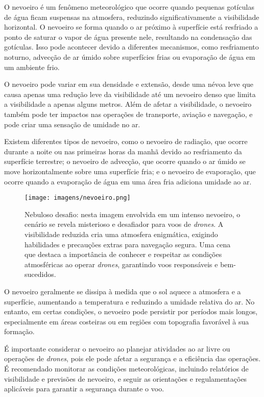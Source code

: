 \documentclass[a4paper, 12pt, onecolumn,singlespacing]{article}
\begin{document}
	O nevoeiro é um fenômeno meteorológico que ocorre quando pequenas gotículas de água ficam suspensas na atmosfera, reduzindo significativamente a visibilidade horizontal. O nevoeiro se forma quando o ar próximo à superfície está resfriado a ponto de saturar o vapor de água presente nele, resultando na condensação das gotículas. Isso pode acontecer devido a diferentes mecanismos, como resfriamento noturno, advecção de ar úmido sobre superfícies frias ou evaporação de água em um ambiente frio.
	
	O nevoeiro pode variar em sua densidade e extensão, desde uma névoa leve que causa apenas uma redução leve da visibilidade até um nevoeiro denso que limita a visibilidade a apenas alguns metros. Além de afetar a visibilidade, o nevoeiro também pode ter impactos nas operações de transporte, aviação e navegação, e pode criar uma sensação de umidade no ar.
	
	Existem diferentes tipos de nevoeiro, como o nevoeiro de radiação, que ocorre durante a noite ou nas primeiras horas da manhã devido ao resfriamento da superfície terrestre; o nevoeiro de advecção, que ocorre quando o ar úmido se move horizontalmente sobre uma superfície fria; e o nevoeiro de evaporação, que ocorre quando a evaporação de água em uma área fria adiciona umidade ao ar.
	
	\begin{figure}[h]
		\centering
		\texttt{[image: imagens/nevoeiro.png]}
		\caption{Nebuloso desafio: nesta imagem envolvida em um intenso nevoeiro, o cenário se revela misterioso e desafiador para voos de \textit{drones}. A visibilidade reduzida cria uma atmosfera enigmática, exigindo habilidades e precauções extras para navegação segura. Uma cena que destaca a importância de conhecer e respeitar as condições atmosféricas ao operar \textit{drones}, garantindo voos responsáveis e bem-sucedidos.}
		\label{fig:nevoeiro}
	\end{figure}
	
	O nevoeiro geralmente se dissipa à medida que o sol aquece a atmosfera e a superfície, aumentando a temperatura e reduzindo a umidade relativa do ar. No entanto, em certas condições, o nevoeiro pode persistir por períodos mais longos, especialmente em áreas costeiras ou em regiões com topografia favorável à sua formação.
	
	É importante considerar o nevoeiro ao planejar atividades ao ar livre ou operações de \textit{drones}, pois ele pode afetar a segurança e a eficiência das operações. É recomendado monitorar as condições meteorológicas, incluindo relatórios de visibilidade e previsões de nevoeiro, e seguir as orientações e regulamentações aplicáveis para garantir a segurança durante o voo.
	
\end{document}
